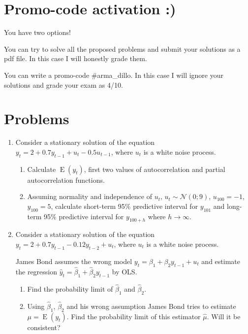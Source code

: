 \documentclass[12pt]{article}
\DeclareMathOperator{\E}{E}
\def \cN{\mathcal{N}}
\begin{document}
\section*{Promo-code activation :)}

You have two options! 

You can try to solve all the proposed problems and submit your solutions as a pdf file.
In this case I will honestly grade them.

You can write a promo-code \#arma\_dillo. 
In this case I will ignore your solutions and grade your exam as 4/10. 

\section*{Problems}

\begin{enumerate}

\item Consider a stationary solution of the equation $y_t = 2 + 0.7y_{t-1} + u_t - 0.5u_{t-1}$, 
	where $u_t$ is a white noise process. 

\begin{enumerate}
	\item Calculate $\E(y_t)$, first two values of autocorrelation and partial autocorrelation functions.
	\item Assuming normality and independence of $u_t$, $u_t \sim \cN(0; 9)$, $u_{100}=-1$, $y_{100}=5$, 
	calculate short-term 95\% predictive interval for $y_{101}$ and long-term 95\% predictive interval for $y_{100+h}$ 
	where $h \to \infty$.
\end{enumerate}
	


\item Consider a stationary solution of the equation $y_t = 2 + 0.7y_{t-1} -0.12y_{t-2} + u_t$, 
where $u_t$ is a white noise process. 

James Bond assumes the wrong model $y_t = \beta_1 + \beta_2 y_{t-1} + u_t$ 
and estimate the regression $\hat y_t = \hat\beta_1 + \hat\beta_2 y_{t-1}$ by OLS.

\begin{enumerate}
	\item Find the probability limit of $\hat\beta_1$ and $\hat\beta_2$. 
	\item Using $\hat\beta_1$, $\hat\beta_2$ and his wrong assumption James Bond tries to estimate $\mu = \E(y_t)$. 
	Find the probability limit of this estimator $\hat\mu$. Will it be consistent?
\end{enumerate}


\end{enumerate}
\end{document}
